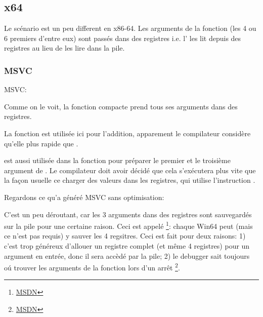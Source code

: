 \subsection{x64}


Le scénario est un peu different en x86-64. Les arguments de la fonction (les 4 ou
6 premiers d'entre eux) sont passés dans des registres i.e. l'
les lit depuis des registres au lieu de les lire dans la pile.

\subsubsection{MSVC}

\Optimizing MSVC:



Comme on le voit, la fonction compacte \ttf prend tous ses arguments dans des registres.

La fonction \LEA est utilisée ici pour l'addition,
apparement le compilateur considère qu'elle plus rapide que .

\LEA est aussi utilisée dans la fonction \main pour préparer le premier et le troisième
argument de \ttf. Le compilateur doit avoir décidé que cela s'exécutera plus vite
que la façon usuelle ce charger des valeurs dans les registres, qui utilise l'instruction
\MOV.

Regardons ce qu'a généré MSVC sans optimisation:



C'est un peu déroutant, car les 3 arguments dans des registres sont sauvegardés
sur la pile pour une certaine raison.
\label{shadow_space}
Ceci est appelé  %
\footnote{\href{http://go.yurichev.com/17256}{MSDN}}: 
chaque Win64 peut (mais ce n'est pas requis) y sauver les 4 regsitres. %
Ceci est fait pour deux raisons:
1) c'est trop généreux d'allouer un registre complet (et même 4 registres) pour
un argument en entrée, donc il sera accèdé par la pile;
2) le debugger sait toujours oú trouver les arguments de la fonction lors d'un arrêt
\footnote{\href{http://go.yurichev.com/17257}{MSDN}}.

